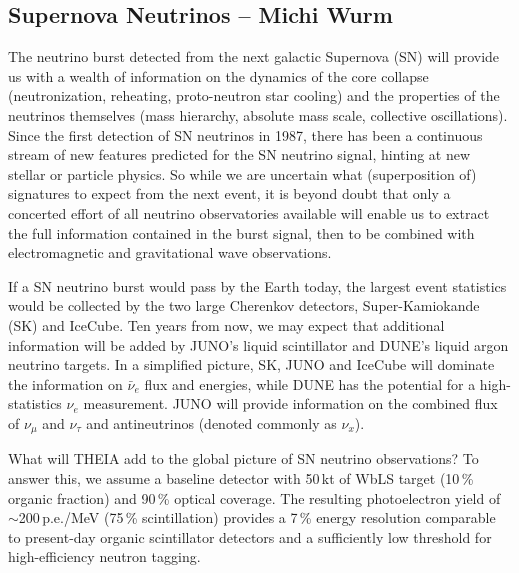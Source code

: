 \subsection{Supernova Neutrinos -- Michi Wurm}


The neutrino burst detected from the next galactic Supernova (SN) will provide us with a wealth of information on the dynamics of the core collapse (neutronization, reheating, proto-neutron star cooling) and the properties of the neutrinos themselves (mass hierarchy, absolute mass scale, collective oscillations). Since the first detection of SN neutrinos in 1987, there has been a continuous stream of new features predicted for the SN neutrino signal, hinting at new stellar or particle physics. So while we are uncertain what (superposition of) signatures to expect from the next event, it is beyond doubt that only a concerted effort of all neutrino observatories available will enable us to extract the full information contained in the burst signal, then to be combined with electromagnetic and gravitational wave observations.

If a SN neutrino burst would pass by the Earth today, the largest event statistics would be collected by the two large Cherenkov detectors, Super-Kamiokande (SK) and IceCube. Ten years from now, we may expect that additional information will be added by JUNO's liquid scintillator and DUNE's liquid argon neutrino targets. In a simplified picture, SK, JUNO and IceCube will dominate the information on $\bar\nu_e$ flux and energies, while DUNE has the potential for a high-statistics $\nu_e$ measurement. JUNO will provide information on the combined flux of $\nu_\mu$ and $\nu_\tau$ and antineutrinos (denoted commonly as $\nu_x$).


What will THEIA add to the global picture of SN neutrino observations? To answer this, we assume a baseline detector with 50\,kt of WbLS target (10\,\% organic fraction) and 90\,\% optical coverage. The resulting photoelectron yield of $\sim$200\,p.e./MeV (75\,\% scintillation) provides a 7\,\% energy resolution comparable to present-day organic scintillator detectors and a sufficiently low threshold for high-efficiency neutron tagging.

